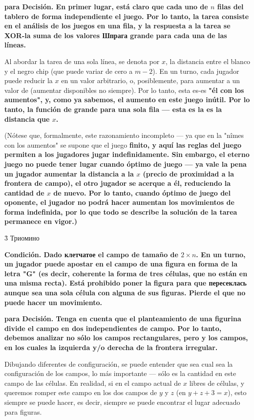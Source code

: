 \bf{para Decisión}. En primer lugar, está claro que cada uno de $n$ filas del tablero de forma independiente el juego. Por lo tanto, la tarea consiste en el análisis de los juegos en una fila, y la respuesta a la tarea se XOR-la suma de los valores Шпрага grande para cada una de las líneas.

Al abordar la tarea de una sola línea, se denota por $x$, la distancia entre el blanco y el negro chip (que puede variar de cero a $m-2$). En un turno, cada jugador puede reducir la $x$ en un valor arbitrario, o, posiblemente, para aumentar a un valor de (aumentar disponibles no siempre). Por lo tanto, esta es-es \bf{"él con los aumentos"}, y, como ya sabemos, el aumento en este juego inútil. Por lo tanto, la función de grande para una sola fila --- esta es la es la distancia que $x$.

(Nótese que, formalmente, este razonamiento incompleto --- ya que en la "nîmes con los aumentos" se supone que el juego \bf{finito}, y aquí las reglas del juego permiten a los jugadores jugar indefinidamente. Sin embargo, el eterno juego no puede tener lugar cuando óptimo de juego --- ya vale la pena un jugador aumentar la distancia a la $x$ (precio de proximidad a la frontera de campo), el otro jugador se acerque a él, reduciendo la cantidad de $x$ de nuevo. Por lo tanto, cuando óptimo de juego del oponente, el jugador no podrá hacer aumentan los movimientos de forma indefinida, por lo que todo se describe la solución de la tarea permanece en vigor.)


\h3{ Триомино }

\bf{Condición}. Dado клетчатое el campo de tamaño de $2 \times n$. En un turno, un jugador puede apostar en el campo de una figura en forma de la letra "G" (es decir, coherente la forma de tres células, que no están en una misma recta). Está prohibido poner la figura para que пересеклась aunque sea una sola célula con alguna de sus figuras. Pierde el que no puede hacer un movimiento.

\bf{para Decisión}. Tenga en cuenta que el planteamiento de una figurina divide el campo en dos independientes de campo. Por lo tanto, debemos analizar no sólo los campos rectangulares, pero y los campos, en los cuales la izquierda y/o derecha de la frontera irregular.

Dibujando diferentes de configuración, se puede entender que sea cual sea la configuración de los campos, lo más importante --- sólo es la cantidad en este campo de las células. En realidad, si en el campo actual de $x$ libres de células, y queremos romper este campo en los dos campos de $y$ y $z$ (en $y+z+3 = x$), esto siempre se puede hacer, es decir, siempre se puede encontrar el lugar adecuado para figuras.

